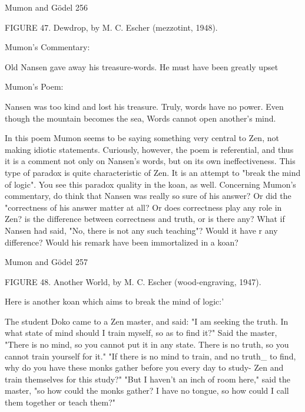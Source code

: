 Mumon and Gödel                                                                                        256

               FIGURE 47. Dewdrop, by M. C. Escher (mezzotint, 1948).

Mumon's Commentary:

Old Nansen gave away his treasure-words. He must have been greatly upset

Mumon's Poem:

       Nansen was too kind and lost his treasure.
       Truly, words have no power.
       Even though the mountain becomes the sea,
       Words cannot open another's mind.

In this poem Mumon seems to be saying something very central to Zen, not making
idiotic statements. Curiously, however, the poem is referential, and thus it is a comment
not only on Nansen’s words, but on its own ineffectiveness. This type of paradox is quite
characteristic of Zen. It is an attempt to "break the mind of logic". You see this paradox
quality in the koan, as well. Concerning Mumon's commentary, do think that Nansen was
really so sure of his answer? Or did the "correctness of his answer matter at all? Or does
correctness play any role in Zen? is the difference between correctness and truth, or is
there any? What if Nansen had said, "No, there is not any such teaching"? Would it have
r any difference? Would his remark have been immortalized in a koan?



Mumon and Gödel                                                                       257

         FIGURE 48. Another World, by M. C. Escher (wood-engraving, 1947).

Here is another koan which aims to break the mind of logic:'

The student Doko came to a Zen master, and said: "I am seeking the truth. In what state
of mind should I train myself, so as to find it?"
        Said the master, "There is no mind, so you cannot put it in any state. There is no
truth, so you cannot train yourself for it."
        "If there is no mind to train, and no truth\_ to find, why do you have these monks
gather before you every day to study- Zen and train themselves for this study?"
        "But I haven't an inch of room here," said the master, "so how could the monks
gather? I have no tongue, so how could I call them together or teach them?"





